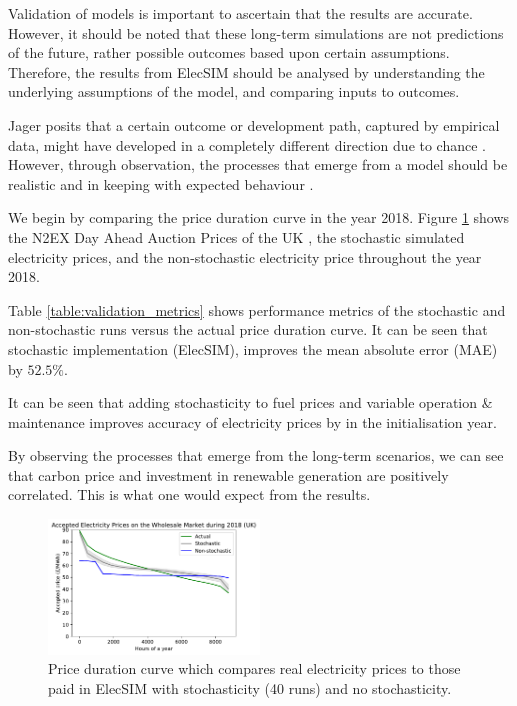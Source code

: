 
Validation of models is important to ascertain that the results are accurate. However, it should be noted that these long-term simulations are not predictions of the future, rather possible outcomes based upon certain assumptions. Therefore, the results from ElecSIM should be analysed by understanding the underlying assumptions of the model, and comparing inputs to outcomes.

Jager posits that a certain outcome or development path, captured by empirical data, might have developed in a completely different direction due to chance \cite{Jager2006a}. However, through observation, the processes that emerge from a model should be realistic and in keeping with expected behaviour \cite{Jager2006}.

We begin by comparing the price duration curve in the year 2018. Figure \ref{fig:price_duration_curve} shows the N2EX Day Ahead Auction Prices of the UK \cite{nordpool_2019}, the stochastic simulated electricity prices, and the non-stochastic electricity price throughout the year 2018.

Table \ref{table:validation_metrics} shows performance metrics of the stochastic and non-stochastic runs versus the actual price duration curve. It can be seen that stochastic implementation (ElecSIM), improves the mean absolute error (MAE) by $52.5\%$.

It can be seen that adding stochasticity to fuel prices and variable operation \& maintenance improves accuracy of electricity prices by  in the initialisation year.

By observing the processes that emerge from the long-term scenarios, we can see that carbon price and investment in renewable generation are positively correlated. This is what one would expect from the results.


\begin{figure}[h]
	\begin{center}
		\includegraphics[width=0.5\textwidth]{figures/load_price_duration_curve_comparison.pdf}
		\caption{Price duration curve which compares real electricity prices to those paid in ElecSIM with stochasticity (40 runs) and no stochasticity.}
		\label{fig:price_duration_curve}
	\end{center}
\end{figure}

